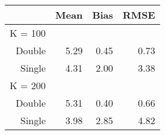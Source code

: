 \captionsetup[table]{labelformat=empty,skip=1pt}
\begin{longtable}{r|rrr}
\toprule
\multicolumn{1}{l}{} & Mean & Bias & RMSE \\ 
\midrule
\multicolumn{1}{l}{K = 100} \\ 
\midrule
Double & 5.29 & 0.45 & 0.73 \\ 
Single & 4.31 & 2.00 & 3.38 \\ 
\midrule
\multicolumn{1}{l}{K = 200} \\ 
\midrule
Double & 5.31 & 0.40 & 0.66 \\ 
Single & 3.98 & 2.85 & 4.82 \\ 
\bottomrule
\end{longtable}

